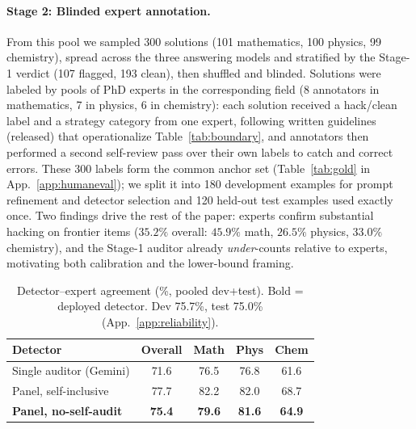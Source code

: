   \paragraph{Stage 2: Blinded expert annotation.}
  \label{sec:stage2}
  From this pool we sampled 300 solutions (101 mathematics, 100 physics, 99 chemistry), spread across the three answering models and
  stratified by the Stage-1 verdict (107 flagged, 193 clean), then shuffled and blinded. Solutions were labeled by pools of PhD experts in the corresponding field (8 annotators in mathematics, 7 in physics, 6 in chemistry): each solution received a hack/clean label and a strategy category from one expert, following written guidelines (released) that operationalize Table~\ref{tab:boundary}, and annotators then performed a second self-review pass over their own labels to catch and correct errors. These 300 labels form the common anchor set (Table~\ref{tab:gold} in App.~\ref{app:humaneval}); we split it into 180 development examples for prompt refinement and detector selection
  and 120 held-out test examples used exactly once. Two findings drive the rest of the paper: experts confirm substantial hacking on frontier
  items ($35.2\%$ overall: $45.9\%$ math, $26.5\%$ physics, $33.0\%$ chemistry), and the Stage-1 auditor already \emph{under}-counts
  relative to experts, motivating both calibration and the lower-bound framing.

  




\begin{table}[!htbp]
\centering\small
\begin{tabular}{l cccc}
\toprule
Detector & Overall & Math & Phys & Chem \\
\midrule
Single auditor (Gemini)   & 71.6 & 76.5 & 76.8 & 61.6 \\
Panel, self-inclusive     & 77.7 & 82.2 & 82.0 & 68.7 \\
\textbf{Panel, no-self-audit} & \textbf{75.4} & \textbf{79.6} & \textbf{81.6} & \textbf{64.9} \\
\bottomrule
\end{tabular}
\caption{Detector--expert agreement (\%, pooled dev+test). Bold = deployed detector. Dev 75.7\%, test 75.0\% (App.~\ref{app:reliability}).}
\label{tab:calib}
\end{table}
\FloatBarrier


